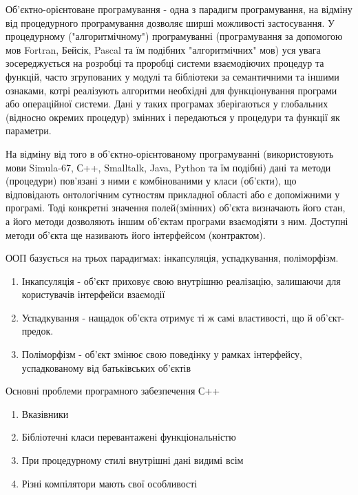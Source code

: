 Об'єктно-орієнтоване програмування - одна з парадигм програмування, на
відміну від процедурного програмування дозволяє ширші можливості
застосування. У процедурному ("алгоритмічному") програмуванні
(програмування за допомогою мов Fortran, Бейсік, Pascal та їм подібних
"алгоритмічних" мов) уся увага зосереджується на розробці та проробці
системи взаємодіючих процедур та функцій, часто згрупованих у модулі та
бібліотеки за семантичними та іншими ознаками, котрі реалізують
алгоритми необхідні для функціонування програми або операційної системи.
Дані у таких програмах зберігаються у глобальних (відносно окремих
процедур) змінних і передаються у процедури та функції як параметри.

На відміну від того в об'єктно-орієнтованому програмуванні
(використовують мови Simula-67, С++, Smalltalk, Java, Python та їм
подібні) дані та методи (процедури) пов'язані з ними є комбінованими у
класи (об'єкти), що відповідають онтологічним сутностям прикладної
області або є допоміжними у програмі. Тоді конкретні значення
полей(змінних) об'єкта визначають його стан, а його методи дозволяють
іншим об'єктам програми взаємодіяти з ним. Доступні методи об'єкта ще
називають його інтерфейсом (контрактом).

ООП базується на трьох парадигмах: інкапсуляція, успадкування,
поліморфізм.

\begin{enumerate}
\def\labelenumi{\arabic{enumi}.}
\tightlist
\item
  Інкапсуляція - об'єкт приховує свою внутрішню реалізацію, залишаючи
  для користувачів інтерфейси взаємодії
\item
  Успадкування - нащадок об'єкта отримує ті ж самі властивості, що й
  об'єкт-предок.
\item
  Поліморфізм - об'єкт змінює свою поведінку у рамках інтерфейсу,
  успадкованому від батьківських об'єктів
\end{enumerate}

Основні проблеми програмного забезпечення С++

\begin{enumerate}
\def\labelenumi{\arabic{enumi}.}
\tightlist
\item
  Вказівники
\item
  Бібліотечні класи перевантажені функціональністю
\item
  При процедурному стилі внутрішні дані видимі всім
\item
  Різні компілятори мають свої особливості
\end{enumerate}

